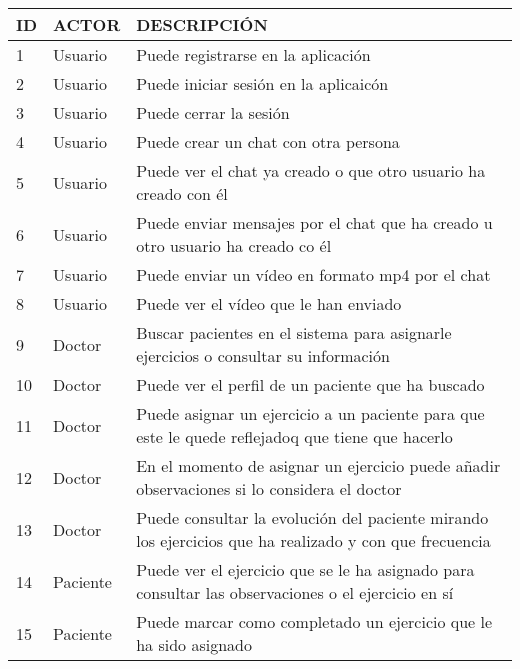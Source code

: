 \begin{tabular}{|llp{12cm}|}
    \hline
    ID & ACTOR    & DESCRIPCIÓN \\ \hline
    1  & Usuario  & Puede registrarse en la aplicación \\ \hline
    2  & Usuario  & Puede iniciar sesión en la aplicaicón \\ \hline
    3  & Usuario  & Puede cerrar la sesión \\ \hline
    4  & Usuario  & Puede crear un chat con otra persona \\ \hline
    5  & Usuario  & Puede ver el chat ya creado o que otro usuario ha creado con él \\ \hline
    6  & Usuario  & Puede enviar mensajes por el chat que ha creado u otro usuario
    ha creado co él \\ \hline
    7  & Usuario  & Puede enviar un vídeo en formato mp4 por el chat \\ \hline
    8  & Usuario  & Puede ver el vídeo que le han enviado \\ \hline
    9  & Doctor   & Buscar pacientes en el sistema para asignarle ejercicios o
    consultar su información \\ \hline
    10 & Doctor   & Puede ver el perfil de un paciente que ha buscado \\ \hline
    11 & Doctor   & Puede asignar un ejercicio a un paciente para que este le quede
    reflejadoq que tiene que hacerlo \\ \hline
    12 & Doctor   & En el momento de asignar un ejercicio puede añadir observaciones
    si lo considera el doctor \\ \hline
    13 & Doctor   & Puede consultar la evolución del paciente mirando los ejercicios
    que ha realizado y con que frecuencia \\ \hline
    14 & Paciente & Puede ver el ejercicio que se le ha asignado para consultar las
    observaciones o el ejercicio en sí \\ \hline
    15 & Paciente & Puede marcar como completado un ejercicio que le ha sido asignado \\ \hline
\end{tabular}




